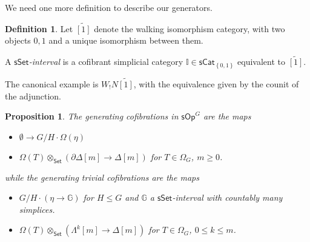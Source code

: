 \documentclass[a4paper,10pt
,draft
]{article}%
\numberwithin{equation}{section}
\numberwithin{figure}{section}
\newtheorem{proposition}[equation]{Proposition}%
\theoremstyle{definition} %
\newtheorem{definition}[equation]{Definition}%
\newcommand{\set}[1]{\left\{#1\right\}}%
\newcommand{\Set}{\ensuremath{\mathsf{Set}}}
\newcommand{\sSet}{\ensuremath{\mathsf{sSet}}}%
\newcommand{\F}{\ensuremath{\mathcal F}}
\newcommand{\1}{\ensuremath{\mathbbm 1}}%
\begin{document}
























We need one more definition to describe our generators.
\begin{definition}
      Let $\widetilde{[1]}$ denote the walking isomorphism category,
      with two objects $0,1$ and a unique isomorphism between them.
      
      A \textit{$\sSet$-interval} is a cofibrant simplicial category $\mathbb I \in \mathsf{sCat}_{\set{0,1}}$ equivalent to $\widetilde{[1]}$.
\end{definition}
The canonical example is $W_!N\widetilde{[1]}$, with the equivalence given by the counit of the adjunction.

\begin{proposition}
      The generating cofibrations in $\mathsf{sOp}^G$
      are the maps
      \begin{itemize}
      \item[(OC1)] $\emptyset \to G/H \cdot \Omega(\eta)$ %
      \item[(OC2)] $\Omega(T) \otimes_{\Set} (\partial \Delta[m] \to \Delta[m])$
            for $T \in \Omega_G$, $m \geq 0$.
      \end{itemize}
      while the generating trivial cofibrations are the maps 
      \begin{itemize}
      \item[(OA1)] 
            $G/H \cdot \left(\eta \to \mathbb{G}\right)$ %
            for $H \leq G$ and $\mathbb G$ a $\sSet$-interval with countably many simplices.
      \item[(OA2)] 
            $\Omega(T) \otimes_{\Set} (\Lambda^k[m] \to \Delta[m])$
            for $T \in \Omega_G$, $0 \leq k \leq m$.
      \end{itemize}
\end{proposition}
\end{document}
